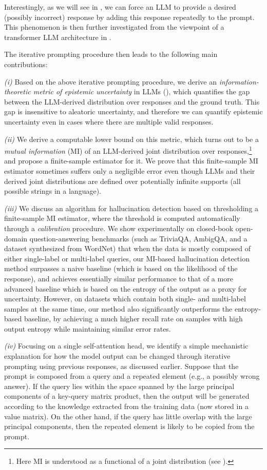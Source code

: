 \documentclass[a4paper]{article}
\theoremstyle{plain}
\theoremstyle{definition}
\theoremstyle{plain}
\begin{document}
Interestingly, as we will see in , we can force an LLM to provide a desired (possibly incorrect) response by adding this response repeatedly to the prompt. This phenomenon is then further investigated from the viewpoint of a transformer LLM architecture in .

%
The iterative prompting procedure then leads to the following main contributions:

\emph{(i)} Based on the above iterative prompting procedure, we derive an
\emph{information-theoretic metric of epistemic uncertainty} in LLMs
(), which quantifies the gap between the LLM-derived
distribution over responses and the ground truth.  This gap is insensitive to
aleatoric uncertainty, and therefore we can quantify epistemic uncertainty even
in cases where there are multiple valid responses.

\emph{(ii)} We derive a computable lower bound on this metric, which turns out to be a
\emph{mutual information} (MI) of an LLM-derived joint distribution
over responses,\footnote{Here MI is understood as a functional of a joint
  distribution (see ).}  and propose a finite-sample estimator for it.
%
We prove that this finite-sample MI estimator sometimes suffers only a
negligible error even though LLMs and their derived joint distributions are
defined over potentially infinite supports (all possible strings in a language).

\emph{(iii)} We discuss an algorithm for hallucination detection based on thresholding a finite-sample MI estimator, where the threshold is computed automatically through a \emph{calibration} procedure.
We show experimentally on closed-book open-domain question-answering benchmarks (such as TriviaQA, AmbigQA, and a dataset synthesized from WordNet) that when the data is mostly composed of either single-label or multi-label queries, our MI-based hallucination detection method surpasses a naive baseline (which is based on the likelihood of the response), and achieves essentially similar performance to that of a more advanced baseline which is based on the entropy of the output as a proxy for uncertainty. However, on datasets which contain both single- and multi-label samples at the same time, our method also significantly outperforms the entropy-based baseline, by achieving a much higher recall rate on samples with high output entropy while maintaining similar error rates.


\emph{(iv)} Focusing on a single self-attention head, we identify a simple mechanistic
explanation for how the model output can be changed through iterative prompting
using previous responses, as discussed earlier.  Suppose that the prompt is
composed from a query and a repeated element (e.g., a possibly wrong answer).
If the query lies within the space spanned by the large principal components of
a key-query matrix product, then the output will be generated according to the
knowledge extracted from the training data (now stored in a value matrix).  On
the other hand, if the query has little overlap with the large principal
components, then the repeated element is likely to be copied from the prompt.
\end{document}
